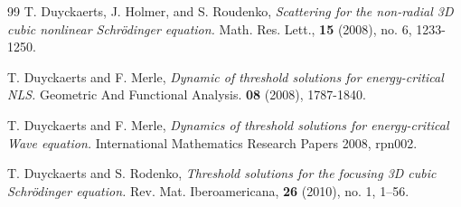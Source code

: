 \documentclass[12pt]{amsart}
\begin{document}
\begin{thebibliography}{99}
T. Duyckaerts, J. Holmer, and S. Roudenko, \emph{Scattering for the non-radial 3D cubic nonlinear Schr\"{o}dinger equation.}
Math. Res. Lett., \textbf{15} (2008), no. 6, 1233-1250.

 T. Duyckaerts and F. Merle, \emph{Dynamic of threshold solutions for energy-critical NLS.}
Geometric And Functional Analysis. \textbf{08} (2008), 1787-1840.

 T. Duyckaerts and F. Merle, \emph{Dynamics of threshold solutions for energy-critical Wave equation.}
International Mathematics Research Papers 2008, rpn002.

 T. Duyckaerts and S. Rodenko, \emph{Threshold solutions for the focusing 3D cubic Schr\"odinger equation.} Rev. Mat. Iberoamericana, \textbf{26} (2010), no. 1, 1--56.






%



\end{thebibliography}
\end{document}
